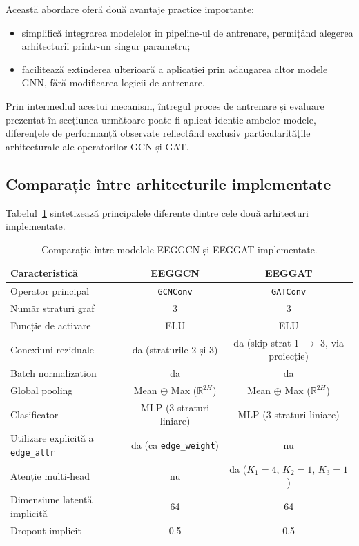 \documentclass[12pt,a4paper]{report}
\theoremstyle{definition}
\theoremstyle{remark}
\begin{document}
Această abordare oferă două avantaje practice importante:
\begin{itemize}
    \item simplifică integrarea modelelor în pipeline-ul de antrenare, permițând alegerea arhitecturii printr-un singur parametru;
    \item facilitează extinderea ulterioară a aplicației prin adăugarea altor modele GNN, fără modificarea logicii de antrenare.
\end{itemize}

Prin intermediul acestui mecanism, întregul proces de antrenare și evaluare prezentat în secțiunea următoare poate fi aplicat identic ambelor modele, diferențele de performanță observate reflectând exclusiv particularitățile arhitecturale ale operatorilor GCN și GAT.

\subsection{Comparație între arhitecturile implementate}

Tabelul~\ref{tab:gcn_gat_compare} sintetizează principalele diferențe dintre cele două arhitecturi implementate.

\begin{table}[H]
    \centering
    \caption{Comparație între modelele EEGGCN și EEGGAT implementate.}
    \label{tab:gcn_gat_compare}
    \begin{tabular}{|p{3cm}|c|c|}
        \hline
        \textbf{Caracteristică} & \textbf{EEGGCN} & \textbf{EEGGAT} \\
        \hline
        Operator principal & \texttt{GCNConv} & \texttt{GATConv} \\
        \hline
        Număr straturi graf & 3 & 3 \\
        \hline
        Funcție de activare & ELU & ELU \\
        \hline
        Conexiuni reziduale & da (straturile 2 și 3) & da (skip strat 1 $\to$ 3, via proiecție) \\
        \hline
        Batch normalization & da & da \\
        \hline
        Global pooling & Mean $\oplus$ Max ($\mathbb{R}^{2H}$) & Mean $\oplus$ Max ($\mathbb{R}^{2H}$) \\
        \hline
        Clasificator & MLP (3 straturi liniare) & MLP (3 straturi liniare) \\
        \hline
        Utilizare explicită a \texttt{edge\_attr} & da (ca \texttt{edge\_weight}) & nu \\
        \hline
        Atenție multi-head & nu & da ($K_1=4$, $K_2=1$, $K_3=1$) \\
        \hline
        Dimensiune latentă implicită & 64 & 64 \\
        \hline
        Dropout implicit & 0.5 & 0.5 \\
        \hline
    \end{tabular}
\end{table}
\end{document}
